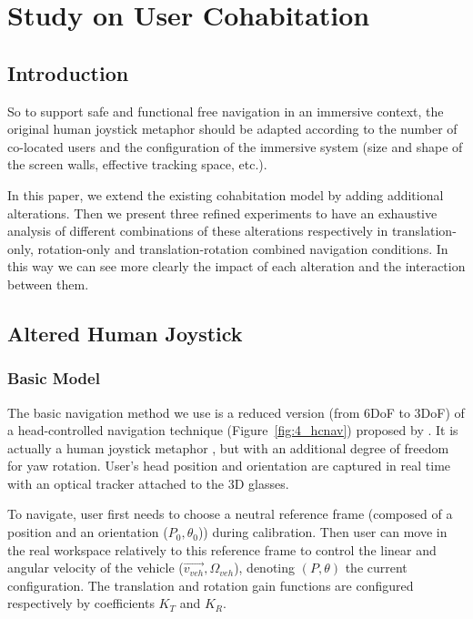\chapter{Study on User Cohabitation}
\label{chapter:expe_cohab}
\minitoc

\section{Introduction}

So to support safe and functional free navigation in an immersive context, the original human joystick metaphor should be adapted according to the number of co-located users and the configuration of the immersive system (size and shape of the screen walls, effective tracking space, etc.).

In this paper, we extend the existing cohabitation model by adding additional alterations. Then we present three refined experiments to have an exhaustive analysis of different combinations of these alterations respectively in translation-only, rotation-only and translation-rotation combined navigation conditions. In this way we can see more clearly the impact of each alteration and the interaction between them.

\section{Altered Human Joystick}

\subsection{Basic Model}
The basic navigation method we use is a reduced version (from 6DoF to 3DoF) of a head-controlled navigation technique (Figure~\ref{fig:4_hcnav}) proposed by \citet{Bourdot2002HCNav}. It is actually a human joystick metaphor \citep{McMahan2012EDF}, but with an additional degree of freedom for yaw rotation. User's head position and orientation are captured in real time with an optical tracker attached to the 3D glasses.

To navigate, user first needs to choose a neutral reference frame (composed of a position and an orientation ($P_{0}, \theta_{0}$)) during calibration. Then user can move in the real workspace relatively to this reference frame to control the linear and angular velocity of the vehicle ($\overrightarrow{v_{veh}}, \Omega_{veh}$), denoting $(P, \theta)$ the current configuration. The translation and rotation gain functions are configured respectively by coefficients $K_{T}$ and $K_{R}$.

